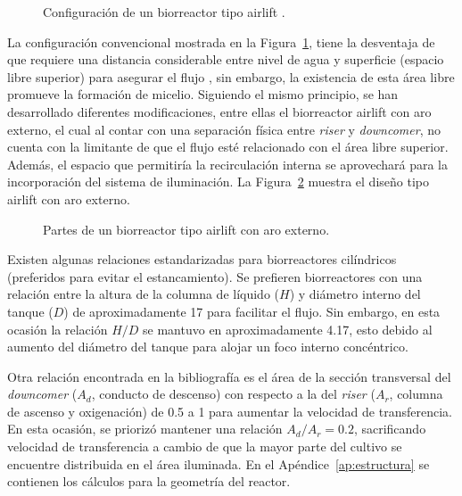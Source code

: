 \documentclass[11pt,tesis,twoside,openright,spanish]{upiiztt}
\begin{document}
\begin{figure}[H]
  \centering
  \caption{Configuración de un biorreactor tipo airlift \cite{Cerrone2025}.}
  \label{fig:airlift_config}
\end{figure}

La configuración convencional mostrada en la Figura~\ref{fig:airlift_config}, tiene la desventaja de que
requiere una distancia considerable entre nivel de agua y superficie (espacio libre
superior) para asegurar el flujo \cite{Cerrone2025}, sin embargo, la existencia de esta área libre
promueve la formación de micelio. Siguiendo el mismo principio, se han
desarrollado diferentes modificaciones, entre ellas el biorreactor airlift con aro
externo, el cual al contar con una separación física entre \textit{riser} y \textit{downcomer}, no
cuenta con la limitante de que el flujo esté relacionado con el área libre superior.
Además, el espacio que permitiría la recirculación interna se aprovechará para la
incorporación del sistema de iluminación. La Figura~\ref{fig:partes_airlift} muestra el diseño tipo airlift
con aro externo.

\begin{figure}[H]
  \centering
  \caption{Partes de un biorreactor tipo airlift con aro externo.}
  \label{fig:partes_airlift}
\end{figure}

Existen algunas relaciones estandarizadas para biorreactores cilíndricos
(preferidos para evitar el estancamiento). Se prefieren biorreactores con una
relación entre la altura de la columna de líquido ($H$) y diámetro interno del tanque
($D$) de aproximadamente 17 para facilitar el flujo. Sin embargo, en esta ocasión la
relación $H/D$ se mantuvo en aproximadamente 4.17, esto debido al aumento del
diámetro del tanque para alojar un foco interno concéntrico.

Otra relación encontrada en la bibliografía es el área de la sección transversal del
\textit{downcomer} ($A_d$, conducto de descenso) con respecto a la del \textit{riser} ($A_r$, columna de
ascenso y oxigenación) de 0.5 a 1 para aumentar la velocidad de transferencia. En
esta ocasión, se priorizó mantener una relación $A_d/A_r = 0.2$, sacrificando velocidad de
transferencia a cambio de que la mayor parte del cultivo se encuentre distribuida
en el área iluminada. En el Apéndice~\ref{ap:estructura} se contienen los cálculos para la geometría
del reactor.
\end{document}
